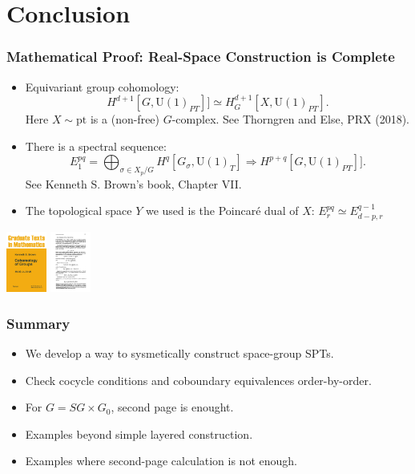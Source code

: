 \documentclass[xcolor=table, 11pt, aspectratio=43]{beamer}
\newcommand{\uone}{\mathrm U(1)}
\begin{document}
\section{Conclusion}

\begin{frame}
\frametitle{Mathematical Proof: Real-Space Construction is Complete}
\begin{itemize}
\item Equivariant group cohomology:
\[H^{d+1}[G, \uone_{PT}]]\simeq H^{d+1}_G[X, \uone_{PT}].\]
Here $X\sim\text{pt}$ is a (non-free) $G$-complex. See Thorngren and Else, PRX (2018).
\item There is a spectral sequence:
\[E_1^{pq}=\bigoplus_{\sigma\in X_p/G}H^q[G_\sigma,\uone_T]\Rightarrow
 H^{p+q}[G, \uone_{PT}]].\]
See Kenneth S. Brown's book, Chapter VII.
\item The topological space $Y$ we used is the Poincar\'e dual of $X$: $E^{pq}_r\simeq E^{q-1}_{d-p,r}$
\end{itemize}
\begin{center}
	\includegraphics[height=2cm]{brown_book}
	\includegraphics[height=2cm]{brown_ss}
\end{center}
\end{frame}

\begin{frame}
\frametitle{Summary}
\begin{itemize}
\item We develop a way to sysmetically construct space-group SPTs.
\item Check cocycle conditions and coboundary equivalences order-by-order.
\item For $G=SG\times G_0$, second page is enought.
\item Examples beyond simple layered construction.
\item Examples where second-page calculation is not enough.
\end{itemize}
\end{frame}
\end{document}
